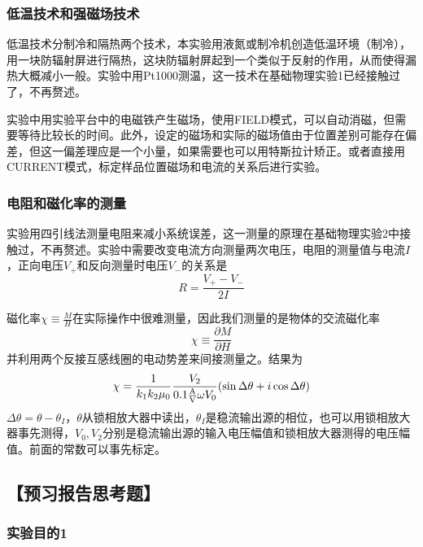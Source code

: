 \documentclass[11pt,a4paper]{ctexart}
\newcommand{\beq}{\begin{equation}}
\newcommand{\eeq}{\end{equation}}
\newcommand{\pfrac}[2]{\frac{\partial #1}{\partial #2}}
\begin{document}
\subsubsection{低温技术和强磁场技术}
低温技术分制冷和隔热两个技术，本实验用液氮或制冷机创造低温环境（制冷），用一块防辐射屏进行隔热，这块防辐射屏起到一个类似于反射的作用，从而使得漏热大概减小一般。实验中用Pt1000测温，这一技术在基础物理实验1已经接触过了，不再赘述。
\par
实验中用实验平台中的电磁铁产生磁场，使用FIELD模式，可以自动消磁，但需要等待比较长的时间。此外，设定的磁场和实际的磁场值由于位置差别可能存在偏差，但这一偏差理应是一个小量，如果需要也可以用特斯拉计矫正。或者直接用CURRENT模式，标定样品位置磁场和电流的关系后进行实验。
\subsubsection{电阻和磁化率的测量}
实验用四引线法测量电阻来减小系统误差，这一测量的原理在基础物理实验2中接触过，不再赘述。实验中需要改变电流方向测量两次电压，电阻的测量值与电流$I$，正向电压$V_+$和反向测量时电压$V_-$的关系是\cite{lec}
\beq
R = \frac{V_+ - V_-}{2I}
\eeq
\par
磁化率$\chi \equiv \frac M H$在实际操作中很难测量，因此我们测量的是物体的交流磁化率
\beq
\chi \equiv \pfrac{M}{H}
\eeq
并利用两个反接互感线圈的电动势差来间接测量之。结果为
\beq
\chi = \frac{1}{k_1 k_2 \mu_0} \frac{V_2}{0.1 {\rm \frac{A}{V}}\omega V_0} (\sin \Delta \theta + i \cos \Delta \theta)
\eeq
$\Delta \theta = \theta - \theta_I$，$\theta$从锁相放大器中读出，$\theta_I$是稳流输出源的相位，也可以用锁相放大器事先测得，$V_0,V_2$分别是稳流输出源的输入电压幅值和锁相放大器测得的电压幅值。前面的常数可以事先标定。

\subsection{【预习报告思考题】}
\subsubsection{实验目的1}
\end{document}
